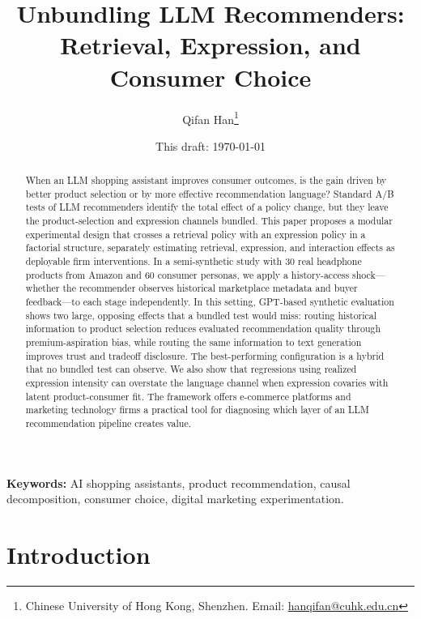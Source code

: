 \documentclass[11pt]{article}
\title{\textbf{Unbundling LLM Recommenders:\\ Retrieval, Expression, and Consumer Choice}}
\author{Qifan Han\thanks{Chinese University of Hong Kong, Shenzhen. Email: \href{mailto:hanqifan@cuhk.edu.cn}{hanqifan@cuhk.edu.cn}}}
\date{This draft: \today}
\begin{document}
\maketitle

\begin{abstract}
\noindent
When an LLM shopping assistant improves consumer outcomes, is the gain driven by better product selection or by more effective recommendation language? Standard A/B tests of LLM recommenders identify the total effect of a policy change, but they leave the product-selection and expression channels bundled. This paper proposes a modular experimental design that crosses a retrieval policy with an expression policy in a factorial structure, separately estimating retrieval, expression, and interaction effects as deployable firm interventions. In a semi-synthetic study with 30 real headphone products from Amazon and 60 consumer personas, we apply a history-access shock---whether the recommender observes historical marketplace metadata and buyer feedback---to each stage independently. In this setting, GPT-based synthetic evaluation shows two large, opposing effects that a bundled test would miss: routing historical information to product selection reduces evaluated recommendation quality through premium-aspiration bias, while routing the same information to text generation improves trust and tradeoff disclosure. The best-performing configuration is a hybrid that no bundled test can observe. We also show that regressions using realized expression intensity can overstate the language channel when expression covaries with latent product-consumer fit. The framework offers e-commerce platforms and marketing technology firms a practical tool for diagnosing which layer of an LLM recommendation pipeline creates value.
\end{abstract}

\medskip
\noindent\textbf{Keywords:} AI shopping assistants, product recommendation, causal decomposition, consumer choice, digital marketing experimentation.

\bigskip
\section{Introduction}
\end{document}
